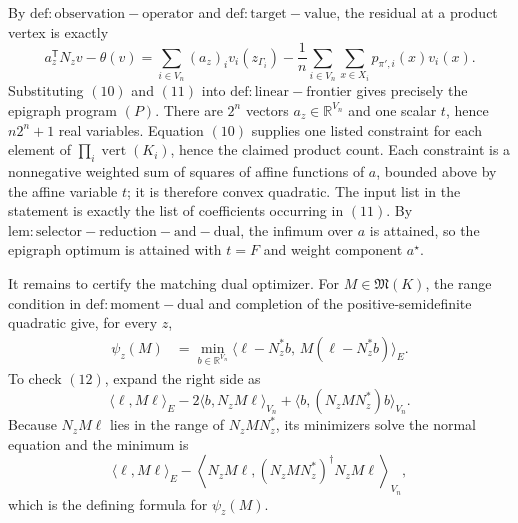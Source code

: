 By \(\mathrm{def:observation-operator}\) and \(\mathrm{def:target-value}\), the residual at a product vertex is exactly
\[
 a_z^{\mathsf T}N_zv-\theta(v)
 =\sum_{i\in V_n}(a_z)_iv_i(z_{\Gamma_i})
 -\frac1n\sum_{i\in V_n}\sum_{x\in X_i}p_{\pi',i}(x)v_i(x).                    \tag{11}
\]
Substituting \((10)\) and \((11)\) into \(\mathrm{def:linear-frontier}\) gives precisely the epigraph program \((P)\).  There are \(2^n\) vectors \(a_z\in\mathbb R^{V_n}\) and one scalar \(t\), hence \(n2^n+1\) real variables.  Equation \((10)\) supplies one listed constraint for each element of \(\prod_i\operatorname{vert}(K_i)\), hence the claimed product count.  Each constraint is a nonnegative weighted sum of squares of affine functions of \(a\), bounded above by the affine variable \(t\); it is therefore convex quadratic.  The input list in the statement is exactly the list of coefficients occurring in \((11)\).  By \(\mathrm{lem:selector-reduction-and-dual}\), the infimum over \(a\) is attained, so the epigraph optimum is attained with \(t=F\) and weight component \(a^{\star}\).

It remains to certify the matching dual optimizer.  For \(M\in\mathfrak M(K)\), the range condition in \(\mathrm{def:moment-dual}\) and completion of the positive-semidefinite quadratic give, for every \(z\),
\[
\begin{aligned}
 \psi_z(M)
 &=\min_{b\in\mathbb R^{V_n}}
 \langle\ell-N_z^{\ast}b,\,M(\ell-N_z^{\ast}b)\rangle_E.
\end{aligned}                                                                     \tag{12}
\]
To check \((12)\), expand the right side as
\[
 \langle\ell,M\ell\rangle_E
 -2\langle b,N_zM\ell\rangle_{V_n}
 +\langle b,(N_zMN_z^{\ast})b\rangle_{V_n}.
\]
Because \(N_zM\ell\) lies in the range of \(N_zMN_z^{\ast}\), its minimizers solve the normal equation and the minimum is
\[
 \langle\ell,M\ell\rangle_E
 -\left\langle N_zM\ell,
 (N_zMN_z^{\ast})^{\dagger}N_zM\ell\right\rangle_{V_n},
\]
which is the defining formula for \(\psi_z(M)\).

